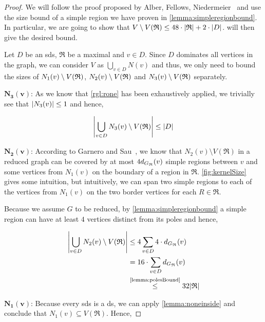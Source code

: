 \begin{proof}
    We will follow the proof proposed by Alber, Fellows, Niedermeier~\cite[Proposition 2]{Alber2004} and use the size bound of a simple region we have proven in \cref{lemma:simpleregionbound}. 
    In particular, we are going to show that $V \setminus V(\mathfrak{R}) \leq 48 \cdot \abs{\mathfrak{R}} + 2 \cdot \abs{D}$.  will then give the desired bound.
    
    Let $D$ be an sds, $\mathfrak{R}$ be a maximal \dreg and $v \in D$. Since $D$ dominates all vertices in the graph, we can consider $V$ as $\bigcup_{v \in D}N(v)$ and thus, we only need to bound the sizes of $N_1(v)\setminus {V(\mathfrak{R})} $, $N_2(v) \setminus {V(\mathfrak{R})} $ and $N_3(v) \setminus {V(\mathfrak{R})} $ separately.
    
    \noindent$\mathbf{N_3(v)}$: As we know that \cref{rgl:rone} has been exhaustively applied, we trivially see that $\abs{N_3(v)} \leq 1$ and hence, 
    
    \[\abs{\bigcup_{v \in D}N_3(v) \setminus V(\mathfrak{R})} \leq \abs{D}\]
    
    \noindent$\mathbf{N_2(v)}$: According to Garnero and Sau~\cite[Proposition 2]{Garnero2018}, we know that $N_2(v) \setminus V(\mathfrak{R})$ in a reduced graph can be covered by at most $4 d_{G_{\mathfrak{R}}}(v)$ simple regions between $v$ and some vertices from $N_1(v)$ on the boundary of a region in $\mathfrak{R}$. 
    \cref{fig:kernelSize} gives some intuition, but intuitively, we can span two simple regions to each of the vertices from $N_1(v)$ on the two border vertices for each $R \in \mathfrak{R}$.
    
    Because we assume $G$ to be reduced, by \cref{lemma:simpleregionbound} a simple region can have at least $4$ vertices distinct from its poles and hence,
    
    \begin{equation}
        \begin{split}
            \abs{\bigcup_{v \in D} N_2(v) \setminus V(\mathfrak{R})} &\leq 4 \sum_{v \in D}4 \cdot \dGR(v) \\
            &= 16 \cdot \sum_{v \in D}\dGR(v) \\
            &\overset{\text{\cref{lemma:polesBound}}}{\leq} 32 \abs{\mathfrak{R}}
        \end{split}
    \end{equation}
    
    \noindent$\mathbf{N_1(v)}$: Because every sds is a ds, we can apply \cref{lemma:noneinside} and conclude that $N_1(v) \subseteq V(\mathfrak{R})$. 
    Hence,
    

\end{proof}
